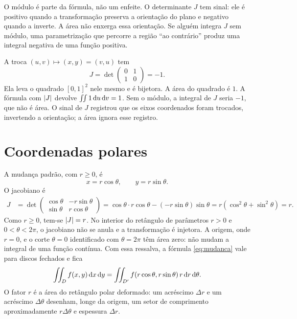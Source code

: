 \documentclass[11pt,a4paper]{article}
\begin{document}
O módulo é parte da fórmula, não um enfeite. O determinante $J$ tem sinal: ele é positivo quando a transformação preserva a orientação do plano e negativo quando a inverte. A área não enxerga essa orientação. Se alguém integra $J$ sem módulo, uma parametrização que percorre a região ``ao contrário'' produz uma integral negativa de uma função positiva.

\begin{exemplo}
A troca $(u,v)\mapsto(x,y)=(v,u)$ tem
\[
J=\det\begin{pmatrix} 0 & 1 \\ 1 & 0 \end{pmatrix}=-1.
\]
Ela leva o quadrado $[0,1]^2$ nele mesmo e é bijetora. A área do quadrado é $1$. A fórmula com $\left\lvert J \right\rvert$ devolve $\iint 1\,\mathrm{d} u\,\mathrm{d} v=1$. Sem o módulo, a integral de $J$ seria $-1$, que não é área. O sinal de $J$ registrou que os eixos coordenados foram trocados, invertendo a orientação; a área ignora esse registro.
\end{exemplo}

\section{Coordenadas polares}

A mudança padrão, com $r\ge 0$, é
\[
x=r\cos\theta,\qquad y=r\sin\theta.
\]
O jacobiano é
\begin{align*}
J
&=\det\begin{pmatrix}
\cos\theta & -r\sin\theta \\
\sin\theta & r\cos\theta
\end{pmatrix}
=\cos\theta\cdot r\cos\theta-(-r\sin\theta)\sin\theta
=r(\cos^2\theta+\sin^2\theta)
=r.
\end{align*}
Como $r\ge 0$, tem-se $\left\lvert J \right\rvert=r$. No interior do retângulo de parâmetros $r>0$ e $0<\theta<2\pi$, o jacobiano não se anula e a transformação é injetora. A origem, onde $r=0$, e o corte $\theta=0$ identificado com $\theta=2\pi$ têm área zero: não mudam a integral de uma função contínua. Com essa ressalva, a fórmula \eqref{eq:mudanca} vale para discos fechados e fica
\[
\iint_D f(x,y)\,\mathrm{d} x\,\mathrm{d} y
=\iint_{D'} f(r\cos\theta,r\sin\theta)\,r\,\mathrm{d} r\,\mathrm{d}\theta.
\]
O fator $r$ é a área do retângulo polar deformado: um acréscimo $\Delta r$ e um acréscimo $\Delta\theta$ desenham, longe da origem, um setor de comprimento aproximadamente $r\Delta\theta$ e espessura $\Delta r$.

\end{document}
